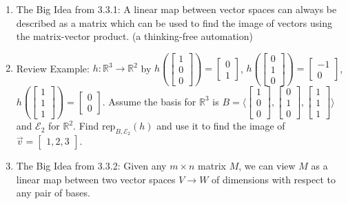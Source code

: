 \documentclass[11pt,fleqn]{article}
\begin{document}
\renewcommand{\headrulewidth}{0pt}
\newcommand{\blank}[1]{\rule{#1}{0.75pt}}
\renewcommand{\d}{\displaystyle}

\newcommand{\bpm}{\begin{pmatrix}}
\newcommand{\epm}{\end{pmatrix}}
\newcommand{\bbm}{\begin{bmatrix}}
\newcommand{\ebm}{\end{bmatrix}}

\vspace*{-0.7in}

\begin{center}
  \large {}
\end{center}

\begin{enumerate}
\item The Big Idea from 3.3.1: A linear map between vector spaces can always be described as a matrix which can be used to find the image of vectors using the matrix-vector product. (a thinking-free automation)

\item Review Example: $h: \mathbb{R}^3 \to \mathbb{R}^2$ by $h\left( \bbm 1\\0\\0 \ebm \right) = \bbm 0\\1\ebm$, $h\left( \bbm 0\\1\\0 \ebm \right) = \bbm -1\\0\ebm$, $h\left( \bbm 1\\1\\1 \ebm \right) = \bbm 0\\0\ebm.$ Assume the basis for $\mathbb{R}^3$ is $B=\langle \bbm 1\\0\\0 \ebm,\bbm 0\\1\\0 \ebm,\bbm 1\\1\\1 \ebm\rangle$ and $\mathcal{E}_2$ for $\mathbb{R}^2.$ Find $\text{rep}_{B,\mathcal{E}_2}(h)$ and use it to find the image of $\vec{v}=\bbm 1,2,3 \ebm.$

\vfill


\item The Big Idea from 3.3.2: Given any $m \times n$ matrix $M$, we can view $M$ as a linear map between two vector spaces $V \to W$ of dimensions \hspace{1.5in} with respect to any pair of bases.\\


\end{enumerate}
\end{document}
